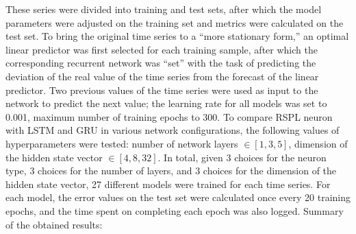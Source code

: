 \documentclass[sn-apa]{sn-jnl}%
\begin{document}
These series were divided into training and test sets, after which the model parameters were adjusted on the training set and metrics were calculated on the test set. To bring the original time series to a “more stationary form,” an optimal linear predictor was first selected for each training sample, after which the corresponding recurrent network was “set” with the task of predicting the deviation of the real value of the time series from the forecast of the linear predictor. Two previous values of the time series were used as input to the network to predict the next value; the learning rate for all models was set to 0.001, maximum number of training epochs to 300. To compare RSPL neuron with LSTM and GRU in various network configurations, the following values of hyperparameters were tested: number of network layers $\in [1, 3, 5]$, dimension of the hidden state vector $\in [4, 8, 32]$.
In total, given 3 choices for the neuron type, 3 choices for the number of layers, and 3 choices for the dimension of the hidden state vector, 27 different models were trained for each time series. For each model, the error values on the test set were calculated once every 20 training epochs, and the time spent on completing each epoch was also logged. Summary of the obtained results: 
\\
\end{document}
